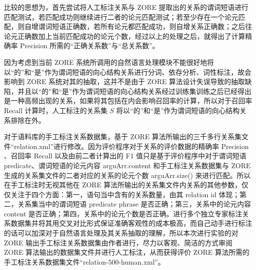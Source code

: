 比较的思想为，首先尝试将人工标注关系与 ZORE 提取出的关系的谓词短语进行匹配测试，若匹配成功则继续进行二者的论元匹配测试；若至少存在一个论元匹配，则自增谓词短语正确数，若所有论元都匹配成功，则自增关系正确数；之后往论元正确数加上当前匹配成功的论元个数，经过以上的处理之后，就得出了计算精确率 Precision 所需的“正确关系数”与“总关系数”。

因为考虑到当前 ZORE 系统所调用的自然语言处理模块不能很好地将以“的”和“是”作为谓词短语的向心结构关系进行分词、依存分析、词性标注，故会影响到 ZORE 系统对其的抽取，这并不是由于 ZORE 算法设计失误导致的抽取缺陷，并且以“的”和“是”作为谓词短语的向心结构关系经过训练集训练之后已经得出是一种高频出现的关系，如果将其包括在内会影响召回率的计算，所以对于召回率 Recall 计算时，人工标注的关系集 $S$ 将以“的”和“是”作为谓词短语的向心结构关系排除在外。

对于语料库的手工标注关系数据集，基于 ZORE 算法所输出的三千多行关系集文件“relation.xml”进行修改。因为评价程序对于关系的评价数据的精确率 Precision 、召回率 Recall 以及由前二者计算出的 F1 值只是基于评价程序中对于谓词短语 predicate、谓词短语的论元内容 arguArr.content 和手工标注关系数据集与 ZORE 生成的关系集文件的二者对应的关系的论元个数 arguArr.size() 来进行匹配。所以在手工标注时无视其他在 ZORE 算法所输出的关系集文件内关系的其他参数，仅仅关注于四个方面：第一，语句当中含有的关系数量，由其 relation id 体现；第二，关系集当中的谓词短语 predicate phrase 是否正确；第三，关系中的论元内容 content 是否正确；第四，关系中的论元个数是否正确。进行多个独立专家标注关系数据集并将其用交叉对比形式保证准确客观性的成本极高，而自己动手进行标注的话可以加深对于自然语言处理及其关系抽取的理解，所以本次进行实验的对 ZORE 输出手工标注关系数据集由作者进行，尽力以客观、简洁的方式审阅 ZORE 算法输出的数据集文件并进行人工标注，从而获得评价 ZORE 算法所需的手工标注关系数据集文件“relation-500-human.xml”。

